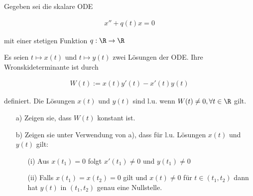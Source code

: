 \begin{exercise}
  Gegeben sei die skalare ODE

  \begin{align*}
    x'' + q(t)x = 0
  \end{align*}

  mit einer stetigen Funktion $q: \R \rightarrow \R$

  Es seien $t \mapsto x(t)$ und $t \mapsto y(t)$ zwei Lösungen der ODE.
  Ihre Wronskideterminante ist durch

  \begin{align*}
    W(t) := x(t)y'(t)-x'(t)y(t)
  \end{align*}

  definiert. Die Lösungen $x(t)$ und $y(t)$ sind l.u. wenn
  $W(t) \neq 0, \forall t \in \R$ gilt.

  \begin{itemize}
    \item[a)] Zeigen sie, dass $W(t)$ konstant ist.
    \item[b)] Zeigen sie unter Verwendung von a), dass für l.u. Lösungen
    $x(t)$ und $y(t)$ gilt:
    \begin{itemize}
      \item[(i)] Aus $x(t_1) = 0$ folgt $x'(t_1) \neq 0$ und $y(t_1) \neq 0$
      \item[(ii)] Falls $x(t_1)=x(t_2)=0$ gilt und $x(t) \neq 0$ für
      $t \in (t_1 , t_2 )$ dann hat $y(t)$ in $(t_1 , t_2 )$ genau eine Nullstelle.
    \end{itemize}
  \end{itemize}

\end{exercise}

